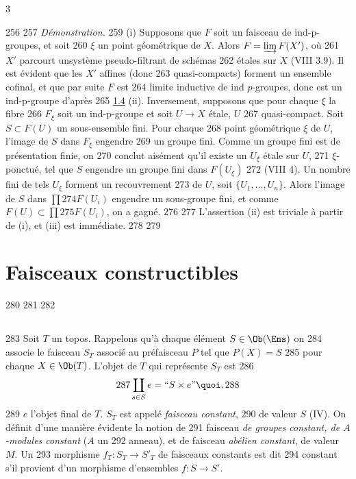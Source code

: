 3	\documentclass[10pt]{../fichiers-configuration-latex/smfart}
\begin{document}
   256	
   257		\emph{Démonstration.}
   259	(i) Supposons que $F$ soit un faisceau de ind-p-groupes, et soit
   260	  $\xi$ un point géométrique de $X$. Alors $F=\varinjlim F(X')$, où
   261	  $X'$ parcourt un\pageoriginale système pseudo-filtrant de schémas
   262	étales sur $X$ (VIII 3.9). Il est évident que les $X'$ affines (donc
   263	quasi-compacts) forment un ensemble cofinal, et que par suite $F$ est
   264	limite inductive de ind $p$-groupes, donc est un ind-p-groupe d'après
   265	\hyperref[IX.prop1.4]{1.4} (ii). Inversement, supposons que pour chaque $\xi$ la fibre
   266	$F_{\xi}$ soit un ind-p-groupe et soit $U\rightarrow X$ étale, $U$
   267	quasi-compact. Soit $S\subset F(U)$ un sous-ensemble fini. Pour chaque
   268	point géométrique $\xi$ de $U$, l'image de $S$ dans $F_{\xi}$ engendre
   269	un groupe fini. Comme un groupe fini est de présentation finie, on
   270	conclut aisément qu'il existe un $U_{\xi}$ étale sur $U$,
   271	$\xi$-ponctué, tel que $S$ engendre un groupe fini dans $F(U_{\xi})$
   272	(\cf VIII 4). Un nombre fini de tels $U_{\xi}$ forment un recouvrement
   273	de $U$, soit $\{U_1,\ldots,U_n\}$. Alors l'image de $S$ dans $\prod
   274	F(U_i)$ engendre un sous-groupe fini, et comme $F(U)\subset \prod
   275	F(U_i)$, on a gagné.
   276	
   277	L'assertion (ii) est triviale à partir de (i), et (iii) est immédiate.
   278	
   279	\section{Faisceaux constructibles}
   280	
   281	\setcounter{subsection}{-1}
   282	\subsection{}
   283	Soit $T$ un topos. Rappelons qu'à chaque élément $S\in \Ob (\Ens)$ on
   284	associe le faisceau $S_T$ associé au préfaisceau $P$ tel que $P(X)=S$
   285	pour chaque $X\in \Ob (T)$. L'objet de $T$ qui représente $S_T$ est
   286	$$
   287	\coprod_{s\in S}e= ``S\times e \mbox{''}{\quoi},
   288	$$
   289	$e$ l'objet final de $T$. $S_T$ est appelé \emph{faisceau constant},
   290	de valeur $S$ (IV). On définit d'une manière évidente la notion de
   291	faisceau \emph{de groupes constant, de $A$-modules constant} ($A$ un
   292	anneau), et de faisceau \emph{abélien constant}, de valeur $M$. Un
   293	morphisme $f_T:S_T\rightarrow S'_T$ de faisceaux constants est dit
   294	constant s'il provient d'un morphisme d'ensembles $f:S\rightarrow S'$.
\end{document}
